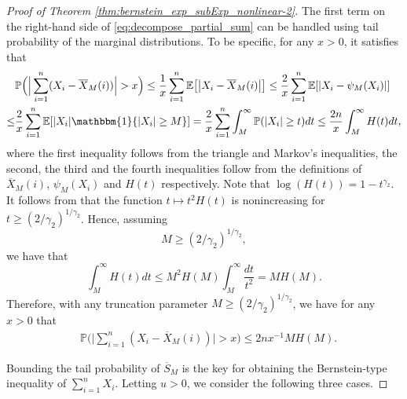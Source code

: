 \documentclass[11pt]{article}
\theoremstyle{plain}
\theoremstyle{definition}
\begin{document}
\begin{proof}[Proof of Theorem \ref{thm:bernstein_exp_subExp_nonlinear-2}]
The first term on the right-hand side of \eqref{eq:decompose_partial_sum} can be handled using tail probability of the marginal distributions. To be specific, for any $x > 0$, it satisfies that
\begin{align*}
    &\mathbb{P}\Big( \Big|\sum_{i = 1}^n(X_i - \overline{X}_M(i))\Big| > x \Big) \leq \frac{1}{x}\sum_{i = 1}^n\mathbb{E}\big[\big|X_i - \overline{X}_M(i)\big|\big] \leq \frac{2}{x}\sum_{i = 1}^n\mathbb{E}[|X_i - \psi_M(X_i)|] \\
    \leq & \frac{2}{x}\sum_{i = 1}^n\mathbb{E}[|X_i|\mathbbm{1}\{|X_i| \geq M\}]= \frac{2}{x}\sum_{i = 1}^n\int_M^{\infty}\mathbb{P}(|X_i| \geq t)dt \leq \frac{2n}{x}\int_M^{\infty}H(t)dt,
\end{align*}
where the first inequality follows from the triangle and Markov's inequalities, the second, the third and the fourth inequalities follow from the definitions of $\overline{X}_M(i)$, $\psi_M(X_i)$ and $H(t)$ respectively.
Note that $\log(H(t)) = 1-t^{\gamma_2}$. It follows from that the function $t \mapsto t^2H(t)$ is nonincreasing for $t \geq (2/\gamma_2)^{1/\gamma_2}$. Hence, assuming
\begin{equation}\label{eq:M_requirement_1}
    M \geq (2/\gamma_2)^{1/\gamma_2},
\end{equation}
we have that
\begin{equation*}
    \int_M^{\infty}H(t)dt \leq M^2H(M)\int_M^{\infty}\frac{dt}{t^2} = MH(M).
\end{equation*}
Therefore, with any truncation parameter $M \geq (2/\gamma_2)^{1/\gamma_2}$, we have for any $x > 0$ that
\begin{equation}\label{eq:tail_truncation}
\begin{aligned}
    &\mathbb{P}\Big( \Big|\sum_{i = 1}^n(X_i - \overline{X}_M(i))\Big| > x \Big) \leq 2nx^{-1}MH(M).
\end{aligned}
\end{equation}

Bounding the tail probability of $\overline{S}_M$ is the key for obtaining the Bernstein-type inequality of $\sum_{i = 1}^nX_i$. 
Letting $u > 0$, we consider the following three cases.


\end{proof}
\end{document}
